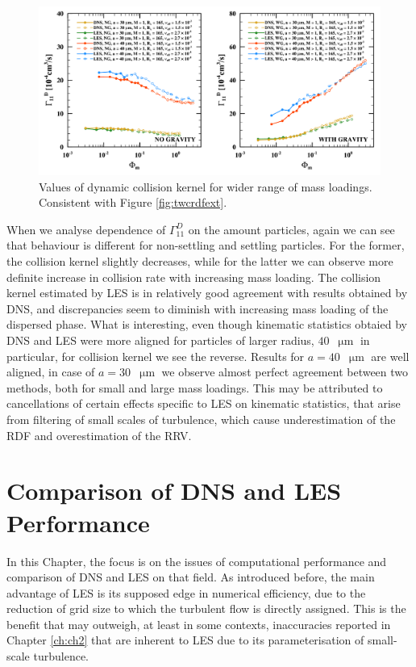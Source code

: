 \documentclass{pracamgren}
\begin{document}
\begin{figure}[h]
\centering
\includegraphics[width=13.5cm]{img/plots/2-2-3f-twcgammaext.pdf}
\caption{
Values of dynamic collision kernel for wider range of mass loadings.
Consistent with Figure \ref{fig:twcrdfext}.
}
\label{fig:twcgammaext}
\end{figure}

When we analyse dependence of $\Gamma^D_{11}$ on the amount particles, again we can see that behaviour is different for non-settling and settling particles.
For the former, the collision kernel slightly decreases, while for the latter we can observe more definite increase in collision rate with increasing mass loading.
The collision kernel estimated by LES is in relatively good agreement with results obtained by DNS, and discrepancies seem to diminish with increasing mass loading of the dispersed phase.
What is interesting, even though kinematic statistics obtaied by DNS and LES were more aligned for particles of larger radius, $40$~$\upmu\text{m}$ in particular, for collision kernel we see the reverse.
Results for $a = 40$~$\upmu\text{m}$ are well aligned, in case of $a = 30$~$\upmu\text{m}$ we observe almost perfect agreement between two methods, both for small and large mass loadings.
This may be attributed to cancellations of certain effects specific to LES on kinematic statistics, that arise from filtering of small scales of turbulence, which cause underestimation of the RDF and overestimation of the RRV.





\chapter{Comparison of DNS and LES Performance}
\label{ch:ch3}

In this Chapter, the focus is on the issues of computational performance and comparison of DNS and LES on that field.
As introduced before, the main advantage of LES is its supposed edge in numerical efficiency, due to the reduction of grid size to which the turbulent flow is directly assigned.
This is the benefit that may outweigh, at least in some contexts, inaccuracies reported in Chapter \ref{ch:ch2} that are inherent to LES due to its parameterisation of small-scale turbulence.
\end{document}
